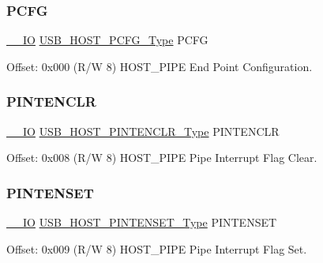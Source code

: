 \subsubsection{\texorpdfstring{PCFG}{PCFG}}
{\footnotesize\ttfamily \mbox{\hyperlink{core__cm0plus_8h_aec43007d9998a0a0e01faede4133d6be}{\+\_\+\+\_\+\+IO}} \mbox{\hyperlink{union_u_s_b___h_o_s_t___p_c_f_g___type}{U\+S\+B\+\_\+\+H\+O\+S\+T\+\_\+\+P\+C\+F\+G\+\_\+\+Type}} P\+C\+FG}



Offset\+: 0x000 (R/W 8) H\+O\+S\+T\+\_\+\+P\+I\+PE End Point Configuration. 

\mbox{\label{struct_usb_host_pipe_adb035ad58ef836aa4a915d83a5cfec73}} 
\subsubsection{\texorpdfstring{PINTENCLR}{PINTENCLR}}
{\footnotesize\ttfamily \mbox{\hyperlink{core__cm0plus_8h_aec43007d9998a0a0e01faede4133d6be}{\+\_\+\+\_\+\+IO}} \mbox{\hyperlink{union_u_s_b___h_o_s_t___p_i_n_t_e_n_c_l_r___type}{U\+S\+B\+\_\+\+H\+O\+S\+T\+\_\+\+P\+I\+N\+T\+E\+N\+C\+L\+R\+\_\+\+Type}} P\+I\+N\+T\+E\+N\+C\+LR}



Offset\+: 0x008 (R/W 8) H\+O\+S\+T\+\_\+\+P\+I\+PE Pipe Interrupt Flag Clear. 

\mbox{\label{struct_usb_host_pipe_a638d95168501256cd970460f5bd370e7}} 
\subsubsection{\texorpdfstring{PINTENSET}{PINTENSET}}
{\footnotesize\ttfamily \mbox{\hyperlink{core__cm0plus_8h_aec43007d9998a0a0e01faede4133d6be}{\+\_\+\+\_\+\+IO}} \mbox{\hyperlink{union_u_s_b___h_o_s_t___p_i_n_t_e_n_s_e_t___type}{U\+S\+B\+\_\+\+H\+O\+S\+T\+\_\+\+P\+I\+N\+T\+E\+N\+S\+E\+T\+\_\+\+Type}} P\+I\+N\+T\+E\+N\+S\+ET}



Offset\+: 0x009 (R/W 8) H\+O\+S\+T\+\_\+\+P\+I\+PE Pipe Interrupt Flag Set. 

\mbox{\label{struct_usb_host_pipe_a4309a937eee9a19e77c9e54705efc353}} 
